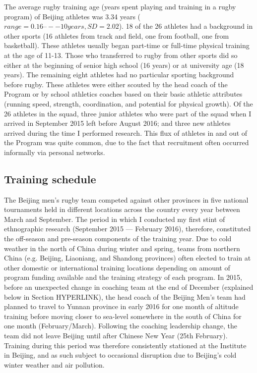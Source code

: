 \begin{CJK}{UTF8}{gbsn}
The average rugby training age (years spent playing and training in a rugby program) of Beijing athletes was 3.34 years ($range = 0.16 –-- 10 years, SD = 2.02$).  18 of the 26 athletes had a background in other sports (16 athletes from track and field, one from football, one from basketball).  These athletes usually began part-time or full-time physical training at the age of 11-13.  Those who transferred to rugby from other sports did so either at the beginning of senior high school (16 years) or at university age (18 years).  The remaining eight athletes had no particular sporting background before rugby.  These athletes were either scouted by the head coach of the Program or by school athletics coaches based on their basic athletic attributes (running speed, strength, coordination, and potential for physical growth).  Of the 26 athletes in the squad, three junior athletes who were part of the squad when I arrived in September 2015 left before August 2016; and three new athletes arrived during the time I performed research.  This flux of athletes in and out of the Program was quite common, due to the fact that recruitment often occurred informally via personal networks.




\subsection{Training schedule}

 The Beijing men's rugby team competed against other provinces in five national tournaments held in different locations across the country   every year between March and September. The period in which I conducted my first stint of ethnographic research (September 2015 –-- February 2016), therefore, constituted the off-season and pre-season components of the training year.  Due to cold weather in the north of China during winter and spring, teams from northern China (e.g. Beijing, Liaoniang, and Shandong provinces) often elected to train   at other domestic or international training locations depending on amount of program funding available and the training strategy of each program.  In 2015, before an unexpected change in coaching team at the end of December (explained below in Section HYPERLINK), the head coach of the Beijing Men's team had planned to travel to Yunnan province in early 2016 for one month of altitude training before moving closer to sea-level somewhere in the south of China for one month (February/March).  Following the coaching leadership change, the team did not leave Beijing until after Chinese New Year (25th February). Training during this period was therefore consistently stationed at the Institute in Beijing, and as such subject to occasional disruption due to Beijing's cold winter weather and air pollution.


\end{CJK}

